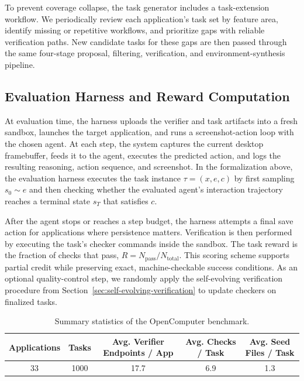 \documentclass{llmxive}
\begin{document}
To prevent coverage collapse, the task generator includes a task-extension workflow. We periodically review each application's task set by feature area, identify missing or repetitive workflows, and prioritize gaps with reliable verification paths. New candidate tasks for these gaps are then passed through the same four-stage proposal, filtering, verification, and environment-synthesis pipeline.

\subsection{Evaluation Harness and Reward Computation}

At evaluation time, the harness uploads the verifier and task artifacts into a fresh sandbox, launches the target application, and runs a screenshot-action
loop with the chosen agent. At each step, the system captures the current desktop framebuffer, feeds it to the agent, executes the predicted action, and
logs the resulting reasoning, action sequence, and screenshot.  In the formalization above, the evaluation harness executes the task instance $\tau = (x, e, c)$ by first sampling $s_0 \sim e$ and then checking whether the evaluated agent's interaction trajectory reaches a terminal state $s_T$ that satisfies
$c$.

After the agent stops or reaches a step budget, the harness attempts a final
save action for applications where persistence matters. Verification is then
performed by executing the task's checker commands inside the sandbox. The task reward is the fraction of checks that pass, $R = N_{\mathrm{pass}} / N_{\mathrm{total}}$. This scoring scheme supports partial credit while preserving exact, machine-checkable success conditions. As an optional quality-control step, we randomly apply the self-evolving verification procedure from Section~\ref{sec:self-evolving-verification} to update checkers on finalized tasks.


\begin{table}[t]
\centering
\small
\begin{tabular}{c c c c c}
\toprule
\textbf{Applications} &
\textbf{Tasks} &
\textbf{Avg. Verifier Endpoints / App} &
\textbf{Avg. Checks / Task} &
\textbf{Avg. Seed Files / Task} \\
\midrule
33 & 1000 & 17.7 & 6.9 & 1.3 \\
\bottomrule
\end{tabular}
\label{tab:data_statistics}
\caption{Summary statistics of the OpenComputer benchmark.}
\end{table}
\end{document}
